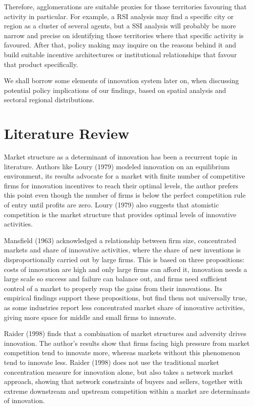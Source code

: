 \documentclass[12pt,a4paper]{article}
\begin{document}
Therefore, agglomerations are suitable proxies for those territories favouring that activity in particular. For example, a RSI analysis may find a specific city or region as a cluster of several agents, but a SSI analysis will probably be more narrow and precise on identifying those territories where that specific activity is favoured. After that, policy making may inquire on the reasons behind it and build suitable incentive architectures or institutional relationships that favour that product specifically.

We shall borrow some elements of innovation system later on, when discussing potential policy implications of our findings, based on spatial analysis and sectoral regional distributions.


\section{Literature Review}

Market structure as a determinant of innovation has been a recurrent topic in literature. Authors like Loury (1979) modeled innovation on an equilibrium environment, its results advocate for a market with finite number of competitive firms for innovation incentives to reach their optimal levels, the author prefers this point even though the number of firms is below the perfect competition rule of entry until profits are zero. Loury (1979) also suggests that atomistic competition is the market structure that provides optimal levels of innovative activities. 

Mansfield (1963) acknowledged a relationship between firm size, concentrated markets and share of innovative activities, where the share of new inventions is disproportionally carried out by large firms. This is based on three propositions: costs of innovation are high and only large firms can afford it, innovation needs a large scale so success and failure can balance out, and firms need sufficient control of a market to properly reap the gains from their innovations. Its empirical findings support these propositions, but find them not universally true, as some industries report less concentrated market share of innovative activities, giving more space for middle and small firms to innovate. 

Raider (1998) finds that a combination of market structures and adversity drives innovation. The author’s results show that firms facing high pressure from market competition tend to innovate more, whereas markets without this phenomenon tend to innovate less. Raider (1998) does not use the traditional market concentration measure for innovation alone, but also takes a network market approach, showing that network constraints of buyers and sellers, together with extreme downstream and upstream competition within a market are determinants of innovation. 
\end{document}
